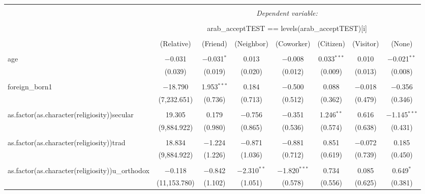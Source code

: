 \documentclass[12pt,letterpaper]{article}
\begin{document}
\begin{table}[!htbp] \centering 
	\caption{} 
	\label{} 
	\begin{adjustbox}{max width=\textwidth}
	\begin{tabular}{@{\extracolsep{5pt}}lccccccc} 
		\\[-1.8ex]\hline 
		\hline \\[-1.8ex] 
		& \multicolumn{7}{c}{\textit{Dependent variable:}} \\ 
		\cline{2-8} 
		\\[-1.8ex] & \multicolumn{7}{c}{arab\_acceptTEST == levels(arab\_acceptTEST)[i]} \\ 
		\\[-1.8ex] & (Relative) & (Friend) & (Neighbor) & (Coworker) & (Citizen) & (Visitor) & (None)\\ 
		\hline \\[-1.8ex] 
		age & $-$0.031 & $-$0.031$^{*}$ & 0.013 & $-$0.008 & 0.033$^{***}$ & 0.010 & $-$0.021$^{**}$ \\ 
		& (0.039) & (0.019) & (0.020) & (0.012) & (0.009) & (0.013) & (0.008) \\ 
		& & & & & & & \\ 
		foreign\_born1 & $-$18.790 & 1.953$^{***}$ & 0.184 & $-$0.500 & 0.088 & $-$0.018 & $-$0.356 \\ 
		& (7,232.651) & (0.736) & (0.713) & (0.512) & (0.362) & (0.479) & (0.346) \\ 
		& & & & & & & \\ 
		as.factor(as.character(religiosity))secular & 19.305 & 0.179 & $-$0.756 & $-$0.351 & 1.246$^{**}$ & 0.616 & $-$1.145$^{***}$ \\ 
		& (9,884.922) & (0.980) & (0.865) & (0.536) & (0.574) & (0.638) & (0.431) \\ 
		& & & & & & & \\ 
		as.factor(as.character(religiosity))trad & 18.834 & $-$1.224 & $-$0.871 & $-$0.881 & 0.851 & $-$0.072 & 0.185 \\ 
		& (9,884.922) & (1.226) & (1.036) & (0.712) & (0.619) & (0.739) & (0.450) \\ 
		& & & & & & & \\ 
		as.factor(as.character(religiosity))u\_orthodox & $-$0.118 & $-$0.842 & $-$2.310$^{**}$ & $-$1.820$^{***}$ & 0.734 & 0.085 & 0.649$^{*}$ \\ 
		& (11,153.780) & (1.102) & (1.051) & (0.578) & (0.556) & (0.625) & (0.381) \\ 

\end{tabular}
\end{adjustbox}
\end{table}
\end{document}
